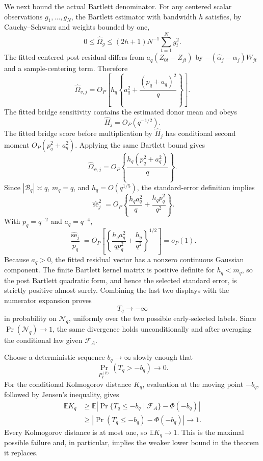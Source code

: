 We next bound the actual Bartlett denominator.  For any centered scalar observations \(g_1,\ldots,g_N\), the Bartlett estimator with bandwidth \(h\) satisfies, by Cauchy--Schwarz and weights bounded by one,
\[
 0\leq\widehat\Omega_g
 \leq(2h+1)N^{-1}\sum_{t=1}^Ng_t^2.
\]
The fitted centered post residual differs from \(a_q(Z_{0t}-Z_{jt})\) by
\(-(\widehat\alpha_j-\alpha_j)W_{jt}\) and a sample-centering term.  Therefore
\[
 \widehat\Omega_{v,j}
 =O_P\!\left[
 h_q\left\{a_q^2+\frac{(p_q+a_q)^2}{q}\right\}
 \right].
\]
The fitted bridge sensitivity contains the estimated donor mean and obeys
\[
 \widehat H_j=O_P(q^{-1/2}).
\]
The fitted bridge score before multiplication by \(\widehat H_j\) has conditional second moment \(O_P(p_q^2+a_q^2)\).  Applying the same Bartlett bound gives
\[
 \widehat\Omega_{\psi,j}
 =O_P\!\left\{\frac{h_q(p_q^2+a_q^2)}q\right\}.
\]
Since \(|\mathcal B_q|\asymp q\), \(m_q=q\), and \(h_q=O(q^{1/5})\), the standard-error definition implies
\[
 \widehat{\operatorname{se}}_j^2
 =O_P\!\left\{
 \frac{h_qa_q^2}{q}
 +\frac{h_qp_q^2}{q^2}
 \right\}.
\]
With \(p_q=q^{-2}\) and \(a_q=q^{-4}\),
\[
 \frac{\widehat{\operatorname{se}}_j}{p_q}
 =O_P\!\left[
 \left\{\frac{h_qa_q^2}{qp_q^2}
       +\frac{h_q}{q^2}\right\}^{1/2}
 \right]=o_P(1).
\]
Because \(a_q>0\), the fitted residual vector has a nonzero continuous Gaussian component.  The finite Bartlett kernel matrix is positive definite for \(h_q<m_q\), so the post Bartlett quadratic form, and hence the selected standard error, is strictly positive almost surely.  Combining the last two displays with the numerator expansion proves
\[
 T_q\longrightarrow-\infty
\]
in probability on \(\mathcal N_q\), uniformly over the two possible early-selected labels.  Since \(\Pr(\mathcal N_q)\to1\), the same divergence holds unconditionally and after averaging the conditional law given \(\mathcal F_A\).

Choose a deterministic sequence \(b_q\to\infty\) slowly enough that
\[
 \Pr_{P_q^{(q)}}(T_q>-b_q)\longrightarrow0.
\]
For the conditional Kolmogorov distance \(K_q\), evaluation at the moving point \(-b_q\), followed by Jensen's inequality, gives
\[
 \begin{aligned}
 \mathbb E K_q
 &\geq
 \mathbb E\left|
  \Pr\{T_q\leq-b_q\mid\mathcal F_A\}-\Phi(-b_q)
 \right|\\
 &\geq
 \left|
  \Pr(T_q\leq-b_q)-\Phi(-b_q)
 \right|
 \longrightarrow1.
 \end{aligned}
\]
Every Kolmogorov distance is at most one, so \(\mathbb E K_q\to1\).  This is the maximal possible failure and, in particular, implies the weaker lower bound in the theorem it replaces.
